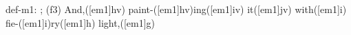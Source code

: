 def-m1: \grealign;
(f3) And,([em1]hv) paint-([em1]hv)ing([em1]iv) it([em1]jv) with([em1]i) fie-([em1]i)ry([em1]h) light,([em1]g)